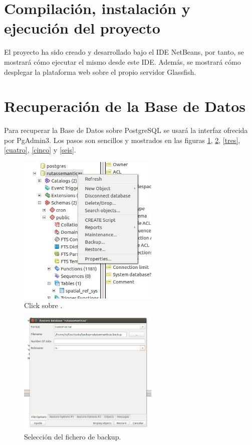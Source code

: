 \section{Compilación, instalación y ejecución del proyecto}

El proyecto ha sido creado y desarrollado bajo el IDE NetBeans, por tanto, se mostrará cómo ejecutar el mismo desde este IDE. Además, se mostrará cómo desplegar la plataforma web sobre el propio servidor Glassfish.

\section{Recuperación de la Base de Datos}
Para recuperar la Base de Datos sobre PostgreSQL se usará la interfaz ofrecida por PgAdmin3. Los pasos son sencillos y mostrados en las figuras \ref{uno}, \ref{dos}, \ref{tres}, \ref{cuatro}, \ref{cinco} y \ref{seis}.

\begin{figure}[h]
  \centering
    \includegraphics[width=0.6\textwidth]{../img/restoredb/uno.jpg}
  \caption{Click sobre .}
  \label{uno}
\end{figure}

\begin{figure}[h]
  \centering
    \includegraphics[width=0.6\textwidth]{../img/restoredb/dos.jpg}
  \caption{Selección del fichero de backup.}
  \label{dos}
\end{figure}

